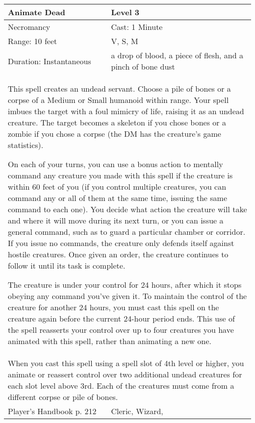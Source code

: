 \documentclass[11pt]{report}
\begin{document}
\begin{table}[H]
	\begin{tabular}{||p{6cm}|p{6cm}||}
		\hline\hline
		\bf{Animate Dead} & Level 3\\ \hline
		Necromancy & Cast: 1 Minute\\ \hline
		Range: 10 feet & V, S, M\\ \hline
		Duration: Instantaneous & a drop of blood, a piece of flesh, and a pinch of bone dust\\ \hline
		\multicolumn{2}{||p{12cm}||}{This spell creates an undead servant. 
Choose a pile of bones or a corpse of a Medium or Small humanoid within range. Your spell imbues the target with a foul mimicry of life, raising it as an undead creature. The target becomes a skeleton if you chose bones or a zombie if you chose a corpse (the DM has the creature’s game statistics). 

On each of your turns, you can use a bonus action to mentally command any creature you made with this spell if the creature is within 60 feet of you (if you control multiple creatures, you can command any or all of them at the same time, issuing the same command to each one). You decide what action the creature will take and where it will move during its next turn, or you can issue a general command, such as to guard a particular chamber or corridor. If you issue no commands, the creature only defends itself against hostile creatures. Once given an order, the creature continues to follow it until its task is complete.

The creature is under your control for 24 hours, after which it stops obeying any command you’ve given it. To maintain the control of the creature for another 24 hours, you must cast this spell on the creature again before the current 24-hour period ends. This use of the spell reasserts your control over up to four creatures you have animated with this spell, rather than animating a new one.}\\ \hline
		\multicolumn{2}{||p{12cm}||}{When you cast this spell using a spell slot of 4th level or higher, you animate or reassert control over two additional undead creatures for each slot level above 3rd. Each of the creatures must come from a different corpse or pile of bones.}\\ \hline
Player's Handbook p. 212 & Cleric, Wizard, \\ \hline\hline
	\end{tabular}
\end{table}
\end{document}
